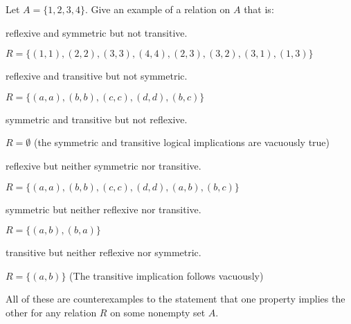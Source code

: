\documentclass[12pt]{article}
\newenvironment{problem}[2][Problem]{\begin{trivlist}
		\item[\hskip \labelsep {\bfseries #1}\hskip \labelsep {\bfseries #2.}]}{\end{trivlist}}
\newenvironment{solution}[2][Solution]{\begin{trivlist}
		\item[\hskip \labelsep {\bfseries #1}\hskip \labelsep {\bfseries #2.}]}{\end{trivlist}}
\begin{document}
 	\begin{problem}{18}
 		Let $A=\{1,2,3,4\}$. Give an example of a relation on $A$ that is:
 		\begin{enumerate}[label=(\alph*)]
 			\item reflexive and symmetric but not transitive.
 			\begin{solution}{(a)}
 				$R=\{(1,1),(2,2),(3,3),(4,4),(2,3),(3,2),(3,1),(1,3)\}$
 			\end{solution}
 			\item reflexive and transitive but not symmetric.
 			\begin{solution}{(b)}
 				$R=\{(a,a),(b,b),(c,c),(d,d),(b,c)\}$
 			\end{solution}
 			\item symmetric and transitive but not reflexive.
 			\begin{solution}{(c)}
 				$R=\emptyset$ (the symmetric and transitive logical implications are vacuously true)
 			\end{solution}
 			\item reflexive but neither symmetric nor transitive.
 			\begin{solution}{(d)}
 				$R=\{(a,a),(b,b),(c,c),(d,d),(a,b),(b,c)\}$
 			\end{solution}
 			\item symmetric but neither reflexive nor transitive.
 			\begin{solution}{(e)}
 				$R=\{(a,b),(b,a)\}$
 			\end{solution}
 			\item transitive but neither reflexive nor symmetric.
 			\begin{solution}{(f)}
 				$R=\{(a,b)\}$ (The transitive implication follows vacuously)
 			\end{solution}
 		
 		All of these are counterexamples to the statement that one property implies the other for any relation $R$ on some nonempty set $A$.
 		\end{enumerate}
 	\end{problem}
 
\end{document}
